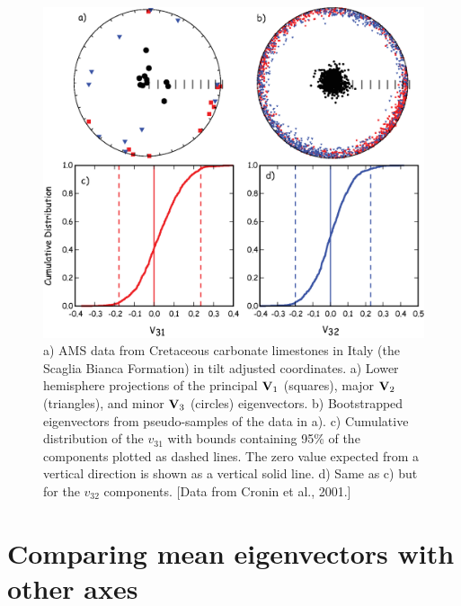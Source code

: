 \begin{figure}[h!tb]
\centering  \includegraphics[width=13 cm]{EPSfiles/kmin.eps}
\caption{a) AMS data from Cretaceous carbonate limestones in Italy (the
Scaglia Bianca Formation) in tilt adjusted coordinates. a) Lower
hemisphere projections of the principal $\hbox{\bf V}_1$ (squares), major 
$\hbox{\bf V}_2$ (triangles), and minor $\hbox{\bf V}_3$ (circles) eigenvectors.  
b) Bootstrapped eigenvectors
from pseudo-samples of the data in a).  c) Cumulative distribution of the $v_{31}$ with bounds containing 95\% of the components plotted as dashed lines.
The zero value expected from a vertical direction is shown as a 
vertical solid line.  d) Same as c) but for the $v_{32}$ components. [Data from Cronin et al., 2001.] }
\label{fig:kmin}
\end{figure}
\nocite{cronin01}

\section{Comparing mean eigenvectors with other axes}

